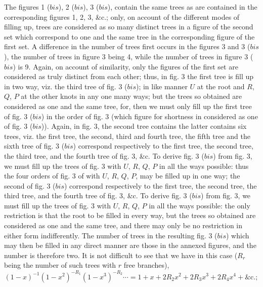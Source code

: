 \documentclass[11pt,a4paper]{book}
\begin{document}
The figures 1 ($bis$), 2 ($bis$), 3 ($bis$), contain the same trees as are contained in the
corresponding figures 1, 2, 3, \&c.; only, on account of the different modes of filling up,
trees are considered as so many distinct trees in a figure of the second set which
correspond to one and the same tree in the corresponding figure of the first set. A
difference in the number of trees first occurs in the figures 3 and 3 ($bis$), the
number of trees in figure 3 being 4, while the number of trees in figure 3 ($bis$) is 9.
Again, on account of similarity, only the figures of the first set are considered as truly
distinct from each other; thus, in fig. 3 the first tree is fill up in two way, viz.
the third tree of fig. 3 ($bis$); in like manner $U$ at the root and $R$, $Q$, $P$ at the other
knots in any one many ways; but the trees so obtained are considered as one and the same
tree, for, then we must only fill up the first tree of fig. 3 ($bis$) in the order of fig. 3
(which figure for shortness in considered as one of fig. 3 ($bis$)). Again, in fig. 3, the
second tree contains the latter contains six trees, viz. the first tree,
the second, third and fourth tree, the fifth tree and the sixth tree of fig. 3 ($bis$)
correspond respectively to the first tree, the second tree, the third tree, and the fourth
tree of fig. 3, \&c. To derive fig. 3 ($bis$) from fig. 3, we must fill up the trees of fig.
3 with $U$, $R$, $Q$, $P$ in all the ways possible: thus the four orders of fig. 3 of
with $U$, $R$, $Q$, $P$, may be filled up in one way; the second of fig. 3 ($bis$)
correspond respectively to the first tree, the second tree, the third tree, and the fourth
tree of fig. 3, \&c. To derive fig. 3 ($bis$) from fig. 3, we must fill up the trees of fig.
3 with $U$, $R$, $Q$, $P$ in all the ways possible: the only restriction is that the root
to be filled in every way, but the trees so obtained are considered as one and the same
tree, and there may only be no restriction in either form indifferently. The number of trees in
the resulting fig. 3 ($bis$) which may then be filled in any direct manner are those in
the annexed figures, and the number is therefore two. It is not difficult to
see that we have in this case ($R_r$ being the number of such trees with $r$ free branches),
\[
(1 - x)^{-1}(1 - x^2)^{-R_1}(1 - x^3)^{-R_2}\cdots = 1 + x + 2R_2 x^2 + 2R_3 x^3 + 2R_4 x^4 + \&\textrm{c.};
\]

\medskip
\end{document}
